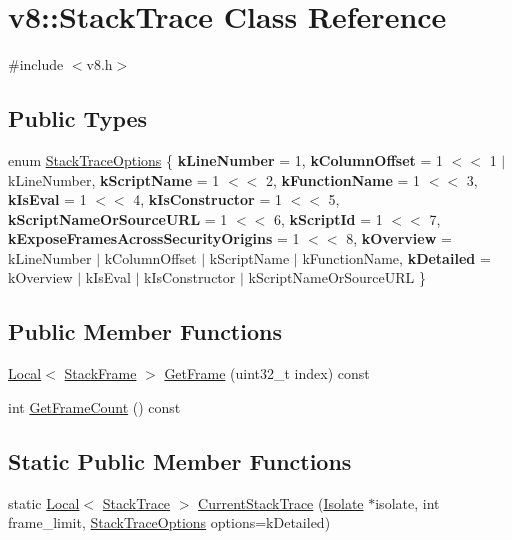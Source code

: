 \hypertarget{classv8_1_1StackTrace}{}\section{v8\+:\+:Stack\+Trace Class Reference}
\label{classv8_1_1StackTrace}


{\ttfamily \#include $<$v8.\+h$>$}

\subsection*{Public Types}
\begin{DoxyCompactItemize}
\item 
enum \mbox{\hyperlink{classv8_1_1StackTrace_a9704e4a37949eb8eb8ccddbddf161492}{Stack\+Trace\+Options}} \{ \newline
{\bfseries k\+Line\+Number} = 1, 
{\bfseries k\+Column\+Offset} = 1 $<$$<$ 1 $\vert$ k\+Line\+Number, 
{\bfseries k\+Script\+Name} = 1 $<$$<$ 2, 
{\bfseries k\+Function\+Name} = 1 $<$$<$ 3, 
\newline
{\bfseries k\+Is\+Eval} = 1 $<$$<$ 4, 
{\bfseries k\+Is\+Constructor} = 1 $<$$<$ 5, 
{\bfseries k\+Script\+Name\+Or\+Source\+U\+RL} = 1 $<$$<$ 6, 
{\bfseries k\+Script\+Id} = 1 $<$$<$ 7, 
\newline
{\bfseries k\+Expose\+Frames\+Across\+Security\+Origins} = 1 $<$$<$ 8, 
{\bfseries k\+Overview} = k\+Line\+Number $\vert$ k\+Column\+Offset $\vert$ k\+Script\+Name $\vert$ k\+Function\+Name, 
{\bfseries k\+Detailed} = k\+Overview $\vert$ k\+Is\+Eval $\vert$ k\+Is\+Constructor $\vert$ k\+Script\+Name\+Or\+Source\+U\+RL
 \}
\end{DoxyCompactItemize}
\subsection*{Public Member Functions}
\begin{DoxyCompactItemize}
\item 
\mbox{\hyperlink{classv8_1_1Local}{Local}}$<$ \mbox{\hyperlink{classv8_1_1StackFrame}{Stack\+Frame}} $>$ \mbox{\hyperlink{classv8_1_1StackTrace_af9f956d39bbfbd7770ae2ab7d6608c0d}{Get\+Frame}} (uint32\+\_\+t index) const
\item 
int \mbox{\hyperlink{classv8_1_1StackTrace_a97a2010fa998f963df290062a8157849}{Get\+Frame\+Count}} () const
\end{DoxyCompactItemize}
\subsection*{Static Public Member Functions}
\begin{DoxyCompactItemize}
\item 
static \mbox{\hyperlink{classv8_1_1Local}{Local}}$<$ \mbox{\hyperlink{classv8_1_1StackTrace}{Stack\+Trace}} $>$ \mbox{\hyperlink{classv8_1_1StackTrace_a9ae3595dfa217d50a60cea7ea2e87366}{Current\+Stack\+Trace}} (\mbox{\hyperlink{classv8_1_1Isolate}{Isolate}} $\ast$isolate, int frame\+\_\+limit, \mbox{\hyperlink{classv8_1_1StackTrace_a9704e4a37949eb8eb8ccddbddf161492}{Stack\+Trace\+Options}} options=k\+Detailed)
\end{DoxyCompactItemize}


